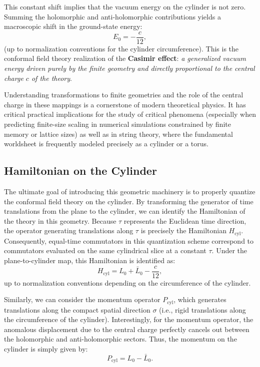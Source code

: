 This constant shift implies that the vacuum energy on the cylinder is not zero. Summing the holomorphic and anti-holomorphic contributions yields a macroscopic shift in the ground-state energy:
\[
    E_0 = -\frac{c}{12},
\]
(up to normalization conventions for the cylinder circumference). This is the conformal field theory realization of the \textbf{Casimir effect}: \textit{a generalized vacuum energy driven purely by the finite geometry and directly proportional to the central charge \(c\) of the theory}.

Understanding transformations to finite geometries and the role of the central charge in these mappings is a cornerstone of modern theoretical physics. It has critical practical implications for the study of critical phenomena (especially when predicting finite-size scaling in numerical simulations constrained by finite memory or lattice sizes) as well as in string theory, where the fundamental worldsheet is frequently modeled precisely as a cylinder or a torus.

\subsection{Hamiltonian on the Cylinder}

The ultimate goal of introducing this geometric machinery is to properly quantize the conformal field theory on the cylinder. By transforming the generator of time translations from the plane to the cylinder, we can identify the Hamiltonian of the theory in this geometry. Because \(\tau\) represents the Euclidean time direction, the operator generating translations along \(\tau\) is precisely the Hamiltonian \(H_{\text{cyl}}\). Consequently, equal-time commutators in this quantization scheme correspond to commutators evaluated on the same cylindrical slice at a constant \(\tau\). Under the plane-to-cylinder map, this Hamiltonian is identified as:
\[
    H_{\text{cyl}} = L_0 + \bar{L}_0 - \frac{c}{12},
\]
up to normalization conventions depending on the circumference of the cylinder.

Similarly, we can consider the momentum operator \(P_{\text{cyl}}\), which generates translations along the compact spatial direction \(\sigma\) (i.e., rigid translations along the circumference of the cylinder). Interestingly, for the momentum operator, the anomalous displacement due to the central charge perfectly cancels out between the holomorphic and anti-holomorphic sectors. Thus, the momentum on the cylinder is simply given by:
\[
    P_{\text{cyl}} = L_0 - \bar{L}_0.
\]

